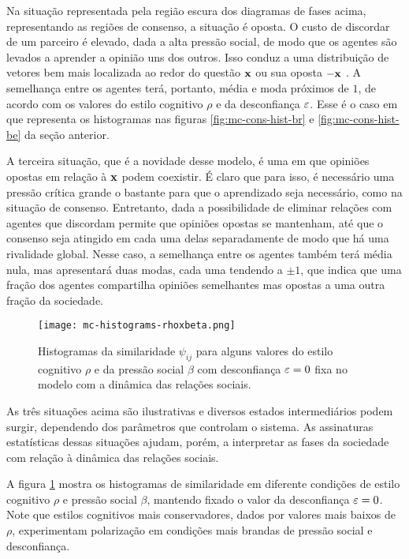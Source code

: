 Na situação representada pela região escura dos diagramas de fases acima, representando as regiões de consenso, a situação é oposta.
O custo de discordar de um parceiro é elevado, dada a alta pressão social, de modo que os agentes são levados a aprender a opinião uns dos outros.
Isso conduz a uma distribuição de vetores bem mais localizada ao redor do questão $\mathbf{x}$ ou sua oposta $-\mathbf{x}$ .
A semelhança entre os agentes terá, portanto, média e moda próximos de $1$, de acordo com os valores do estilo cognitivo $\rho$ e da desconfiança $\varepsilon$.
Esse é o caso em que representa os histogramas nas figuras \ref{fig:mc-cons-hist-br} e \ref{fig:mc-cons-hist-be} da seção anterior.

A terceira situação, que é a novidade desse modelo, é uma em que opiniões opostas em relação à $\mathbf{x}$ podem coexistir.
É claro que para isso, é necessário uma pressão crítica grande o bastante para que o aprendizado seja necessário, como na situação de consenso.
Entretanto, dada a possibilidade de eliminar relações com agentes que discordam permite que opiniões opostas se mantenham, até que o consenso seja atingido em cada uma delas separadamente de modo que há uma rivalidade global.
Nesse caso, a semelhança entre os agentes também terá média nula, mas apresentará duas modas, cada uma tendendo a $\pm 1$, que indica que uma fração dos agentes compartilha opiniões semelhantes mas opostas a uma outra fração da sociedade.

\begin{figure}[h!]\label{fig:mc-hist-br}
  \centering
  \texttt{[image: mc-histograms-rhoxbeta.png]}
  \caption{Histogramas da similaridade $\psi_{ij}$ para alguns valores do estilo cognitivo $\rho$ e da pressão social $\beta$ com desconfiança $\varepsilon=0$ fixa no modelo com a dinâmica das relações sociais.}
\end{figure}

As três situações acima são ilustrativas e diversos estados intermediários podem surgir, dependendo dos parâmetros que controlam o sistema.
As assinaturas estatísticas dessas situações ajudam, porém, a interpretar as fases da sociedade com relação à dinâmica das relações sociais.

A figura \ref{fig:mc-hist-br} mostra os histogramas de similaridade em diferente condições de estilo cognitivo $\rho$ e pressão social $\beta$, mantendo fixado o valor da desconfiança $\varepsilon=0$.
Note que estilos cognitivos mais conservadores, dados por valores mais baixos de $\rho$, experimentam polarização em condições mais brandas de pressão social e desconfiança.


